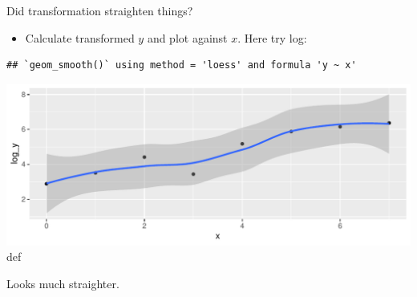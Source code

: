 \documentclass[ignorenonframetext,]{beamer}
\newenvironment{Shaded}{\begin{snugshade}}{\end{snugshade}}
\newcommand{\DataTypeTok}[1]{\textcolor[rgb]{0.13,0.29,0.53}{#1}}
\newcommand{\KeywordTok}[1]{\textcolor[rgb]{0.13,0.29,0.53}{\textbf{#1}}}
\newcommand{\NormalTok}[1]{#1}
\newcommand{\OperatorTok}[1]{\textcolor[rgb]{0.81,0.36,0.00}{\textbf{#1}}}
\newcommand{\StringTok}[1]{\textcolor[rgb]{0.31,0.60,0.02}{#1}}
\providecommand{\tightlist}{%
  \setlength{\itemsep}{0pt}\setlength{\parskip}{0pt}}
\begin{document}
\begin{frame}[fragile]{Did transformation straighten things?}
\protect\hypertarget{did-transformation-straighten-things}{}

\begin{itemize}
\tightlist
\item
  Calculate transformed \(y\) and plot against \(x\). Here try log:
\end{itemize}

\begin{Shaded}
\end{Shaded}

\begin{verbatim}
## `geom_smooth()` using method = 'loess' and formula 'y ~ x'
\end{verbatim}

\includegraphics{figure/unnamed-chunk-24-1.pdf} def

Looks much straighter.

\end{frame}
\end{document}
